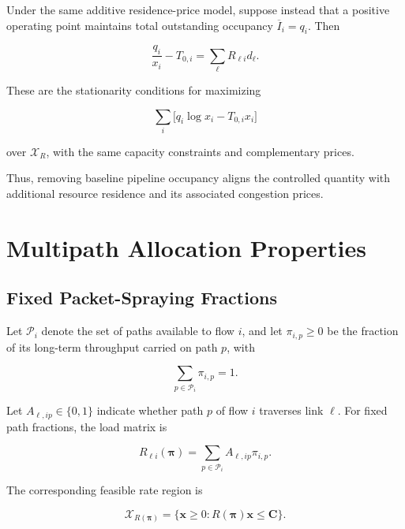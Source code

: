 Under the same additive residence-price model, suppose instead that a positive operating point maintains total outstanding occupancy \(\overline I_i=q_i\). Then

\begin{equation}
\label{eq:app-a-18}
\frac{q_i}{x_i}-T_{0,i}
=\sum_\ell R_{\ell i}d_\ell.
\end{equation}

These are the stationarity conditions for maximizing

\begin{equation}
\label{eq:app-a-19}
\boxed{
\sum_i\big[q_i\log x_i-T_{0,i}x_i\big]
}
\end{equation}

over \(\mathcal X_R\), with the same capacity constraints and complementary prices.

Thus, removing baseline pipeline occupancy aligns the controlled quantity with additional resource residence and its associated congestion prices.


\section{Multipath Allocation Properties}
\label{app:b}

\subsection{Fixed Packet-Spraying Fractions}
\label{app:b-1}

Let \(\mathcal P_i\) denote the set of paths available to flow \(i\), and let \(\pi_{i,p}\ge0\) be the fraction of its long-term throughput carried on path \(p\), with

\begin{equation}
\label{eq:app-b-1}
\sum_{p\in\mathcal P_i}\pi_{i,p}=1.
\end{equation}

Let \(A_{\ell,ip}\in\{0,1\}\) indicate whether path \(p\) of flow \(i\) traverses link \(\ell\). For fixed path fractions, the load matrix is

\begin{equation}
\label{eq:app-b-2}
R_{\ell i}(\boldsymbol\pi)
=
\sum_{p\in\mathcal P_i}A_{\ell,ip}\pi_{i,p}.
\end{equation}

The corresponding feasible rate region is

\begin{equation}
\label{eq:app-b-3}
\mathcal X_{R(\boldsymbol\pi)}
=
\{\mathbf x\ge0:R(\boldsymbol\pi)\mathbf x\le\mathbf C\}.
\end{equation}

